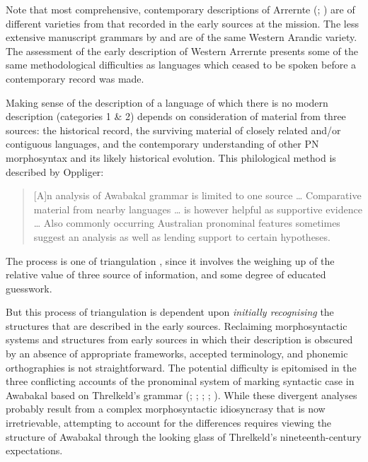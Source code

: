 Note that most comprehensive, contemporary descriptions of Arrernte (\citealt{henderson_topics_2013}; \citealt{wilkins_mparntwe_1989}) are of different varieties from that recorded in the early sources at the mission. The less extensive manuscript grammars by \citet{capell_outline_1958} and \citet{pfitzner_1991} are of the same Western Arandic variety. The assessment of the early description of Western Arrernte presents some of the same methodological difficulties as languages which ceased to be spoken before a contemporary record was made.

Making sense of the description of a language of which there is no modern description (categories 1 \& 2) depends on consideration of material from three sources: the historical record, the surviving material of closely related and/or contiguous languages, and the contemporary understanding of other PN morphosyntax and its likely historical evolution. This philological method is described by Oppliger: 

\begin{quote}
    [A]n analysis of Awabakal grammar is limited to one source … Comparative material from nearby languages … is however helpful as supportive evidence … Also commonly occurring Australian pronominal features sometimes suggest an analysis as well as lending support to certain hypotheses. \citep[64]{oppliger_phonology_1984}
\end{quote}

The process is one of triangulation \citep[33, 147]{amery_warrabarna_2016}, since it involves the weighing up of the relative value of three source of information, and some degree of educated guesswork.

But this process of triangulation is dependent upon \textit{initially recognising} the structures that are described in the early sources. Reclaiming morphosyntactic systems and structures from early sources in which their description is obscured by an absence of appropriate frameworks, accepted terminology, and phonemic orthographies is not straightforward. The potential difficulty is epitomised in the three conflicting accounts of the pronominal system of marking syntactic case in Awabakal based on Threlkeld’s grammar (\citeyear{threlkeld_australian_1834}; \citealt{oppliger_phonology_1984}; \citealt{lissarrague_salvage_2006}; \citealt{dixon_australian_2002}; ). While these divergent analyses probably result from a complex morphosyntactic idiosyncrasy that is now irretrievable, attempting to account for the differences requires viewing the structure of Awabakal through the looking glass of Threlkeld’s nineteenth-century expectations.

